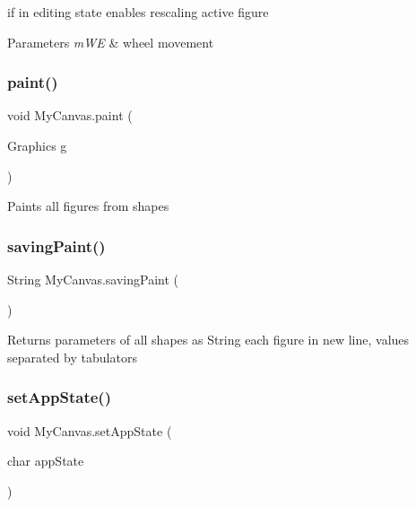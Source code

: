 if in editing state enables rescaling active figure 
\begin{DoxyParams}{Parameters}
{\em m\+WE} & wheel movement \\
\hline
\end{DoxyParams}
\mbox{\label{classMyCanvas_ac040ca723b00a27e0a3001745f745c02}} 
\subsubsection{\texorpdfstring{paint()}{paint()}}
{\footnotesize\ttfamily void My\+Canvas.\+paint (\begin{DoxyParamCaption}\item[{Graphics}]{g }\end{DoxyParamCaption})\hspace{0.3cm}{\ttfamily [inline]}}

Paints all figures from shapes \mbox{\label{classMyCanvas_aa3ac394f78dd7faa9cfba16b15b3ecfa}} 
\subsubsection{\texorpdfstring{saving\+Paint()}{savingPaint()}}
{\footnotesize\ttfamily String My\+Canvas.\+saving\+Paint (\begin{DoxyParamCaption}{ }\end{DoxyParamCaption})\hspace{0.3cm}{\ttfamily [inline]}}

\begin{DoxyReturn}{Returns}
parameters of all shapes as String each figure in new line, values separated by tabulators 
\end{DoxyReturn}
\mbox{\label{classMyCanvas_a6f6db840dc7e9a6e4a42212912f01286}} 
\subsubsection{\texorpdfstring{set\+App\+State()}{setAppState()}}
{\footnotesize\ttfamily void My\+Canvas.\+set\+App\+State (\begin{DoxyParamCaption}\item[{char}]{app\+State }\end{DoxyParamCaption})\hspace{0.3cm}{\ttfamily [inline]}}

